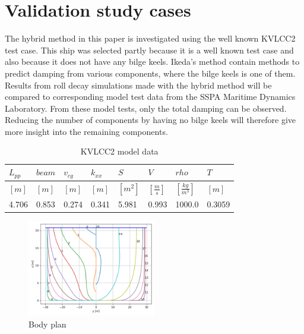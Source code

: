 \section{Validation study cases}\label{validation-study-cases}

\label{sec:validation}

    The hybrid method in this paper is investigated using the well known
KVLCC2 test case. This ship was selected partly because it is a well
known test case and also because it does not have any bilge keels.
Ikeda's method contain methods to predict damping from various
components, where the bilge keels is one of them. Results from roll
decay simulations made with the hybrid method will be compared to
corresponding model test data from the SSPA Maritime Dynamics
Laboratory. From these model tests, only the total damping can be
observed. Reducing the number of components by having no bilge keels
will therefore give more insight into the remaining components.
 
            
    
    
\begin{table}[H]
\small
\center
\caption{KVLCC2 model data}
\label{tab:kvlcc2_model_data}
\begin{tabular}{llllllll}
\toprule\addlinespace
$L_{pp}$ & $beam$ & $v_{cg}$ & $k_{xx}$ & $S$ & $V$ & $rho$ & $T$\\ 
\midrule$[m]$ & $[m]$ & $[m]$ & $[m]$ & $[m^2]$ & $\left[\frac{m}{s}\right]$ & $\left[\frac{kg}{m^3}\right]$ & $[m]$\\ 
4.706 & 0.853 & 0.274 & 0.341 & 5.981 & 0.993 & 1000.0 & 0.3059\\ 

\bottomrule
\end{tabular}
\end{table}

    
 
            
    
    \begin{figure}[H]
        \begin{center}\includegraphics[width = 0.5\textwidth]{figures/body_plan.png}\end{center}
        \vspace{-1cm}
        \caption{Body plan}
        \label{fig:body_plan}
    \end{figure}
    

    